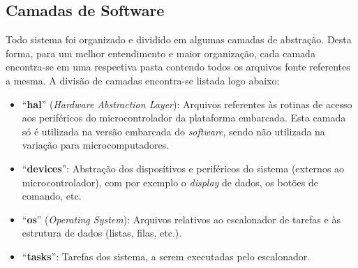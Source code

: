 \subsection{Camadas de Software}

Todo sistema foi organizado e dividido em algumas camadas de abstração. Desta forma, para um melhor entendimento e maior organização, cada camada encontra-se em uma respectiva pasta contendo todos os arquivos fonte referentes a mesma. A divisão de camadas encontra-se listada logo abaixo:

\begin{itemize}
    \item ``\textbf{hal}'' (\textit{Hardware Abstraction Layer}): Arquivos referentes às rotinas de acesso aos periféricos do microcontrolador da plataforma embarcada. Esta camada só é utilizada na versão embarcada do \textit{software}, sendo não utilizada na variação para microcomputadores.
    \item ``\textbf{devices}'': Abstração dos dispositivos e periféricos do sistema (externos ao microcontrolador), com por exemplo o \textit{display} de dados, os botões de comando, etc.
    \item ``\textbf{os}'' (\textit{Operating System}): Arquivos relativos ao escalonador de tarefas e às estrutura de dados (listas, filas, etc.).
    \item ``\textbf{tasks}'': Tarefas dos sistema, a serem executadas pelo escalonador.
\end{itemize}
